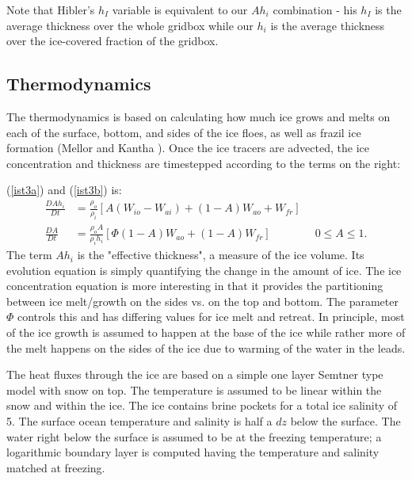 Note that Hibler's $h_I$ variable is equivalent to our $A h_i$
combination - his $h_I$ is the average thickness over the whole
gridbox while our $h_i$ is the average thickness over the ice-covered
fraction of the gridbox. 

\subsection{Thermodynamics}
\label{Growth}

The thermodynamics is based on calculating how much ice grows and
melts on each of the surface, bottom, and sides of the ice floes,
as well as frazil ice formation (Mellor and Kantha \cite{Mellor89}).
Once the ice tracers are advected, the ice concentration and
thickness are timestepped according to the terms on the right:

(\ref{ist3a}) and (\ref{ist3b}) is:
\begin{align}
  \frac{D A h_i }{D t}
  & = \frac{\rho_o }{ \rho_i} \left[ A (W_{io} - W_{ai}) + (1-A) W_{ao}
  + W_{fr} \right]
\label{ist4a} \\
  \frac{D A }{ D t}
  & = \frac{\rho_o A }{ \rho_i h_i} \left[ \Phi (1-A) W_{ao} + (1-A)
  W_{fr} \right] \qquad \qquad 0 \leq A \leq 1 .
\label{ist4b}
\end{align}
The term $Ah_i$ is the "effective thickness", a measure of the ice
volume. Its evolution equation is simply quantifying the change in
the amount of ice. The ice concentration equation is more interesting in
that it provides the partitioning between ice melt/growth on the sides
vs. on the top and bottom. The parameter $\Phi$ controls this and has
differing values for ice melt and retreat. In principle, most of the ice
growth is assumed to happen at the base of the ice while rather more of
the melt happens on the sides of the ice due to warming of the water in
the leads.

The heat fluxes through the ice are based on a simple one layer
Semtner \cite{Semtner76a} type model with
snow on top. The temperature is assumed to be linear within the snow
and within the ice. The ice contains brine pockets for a
total ice salinity of 5. The surface ocean temperature and salinity
is half a $dz$ below the surface. The water right below the surface
is assumed to be at the freezing temperature; a logarithmic boundary
layer is computed having the temperature and salinity matched at
freezing.

